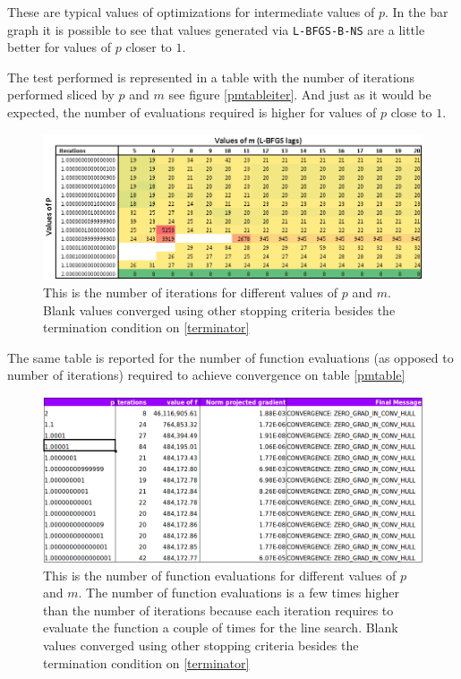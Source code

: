 These are typical values of optimizations for intermediate values of $p$. In the bar graph it is possible to see that values generated via \texttt{L-BFGS-B-NS} are a little better for values of $p$ closer to $1$. 

The test performed is represented in a table with the number of iterations performed sliced by $p$ and $m$ see figure \eqref{pmtableiter}. And just as it would be expected, the number of evaluations required is higher for values of $p$ close to $1$.

\begin{figure}
\begin{center}
\includegraphics[scale=0.25]{Figures/Niterations.PNG}
\caption[Number of function iterations for different values of $p$ and $m$ in the solution of Modified Rosenbrock]{This is the number of iterations for different values of $p$ and $m$. Blank values converged using other stopping criteria besides the termination condition on \eqref{terminator}}
\label{pmtableiter}
\end{center}
\end{figure}

The same table is reported for the number of function evaluations (as opposed to number of iterations) required to achieve convergence on table \eqref{pmtable}

\begin{figure}
\begin{center}
\includegraphics[scale=0.40]{Figures/Nevaluations.png}
\caption[Number of function evaluations for different values of $p$ and $m$ in the solution of Modified Rosenbrock]{This is the number of function evaluations for different values of $p$ and $m$. The number of function evaluations is a few times higher than the number of iterations because each iteration requires to evaluate the function a couple of times for the line search. Blank values converged using other stopping criteria besides the termination condition on \eqref{terminator}}
\label{pmtable}
\end{center}
\end{figure}

